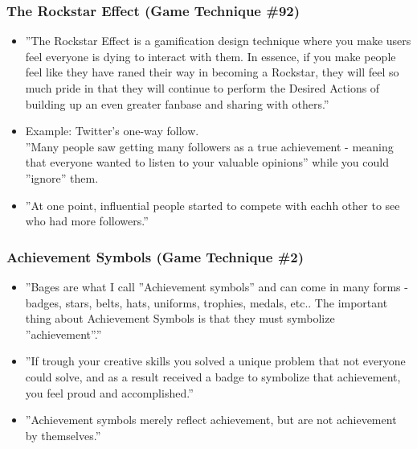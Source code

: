 \subsubsection{The Rockstar Effect (Game Technique \#92)}
\begin{itemize}
    \item ''The Rockstar Effect is a gamification design technique where you make users feel everyone is dying to interact with them. In essence, if you make people feel like they have raned their way in becoming a Rockstar, they will feel so much pride in that they will continue to perform the Desired Actions of building up an even greater fanbase and sharing with others.''
    \item Example: Twitter's one-way follow.\\
    ''Many people saw getting many followers as a true achievement - meaning that everyone wanted to listen to your valuable opinions'' while you could ''ignore'' them.
    \item ''At one point, influential people started to compete with eachh other to see who had more followers.''
\end{itemize}

\subsubsection{Achievement Symbols (Game Technique \#2)}
\begin{itemize}
    \item ''Bages are what I call ''Achievement symbols'' and can come in many forms - badges, stars, belts, hats, uniforms, trophies, medals, etc.. The important thing about Achievement Symbols is that they must symbolize ''achievement''.''
    \item ''If trough your creative skills you solved a unique problem that not everyone could solve, and as a result received a badge to symbolize that achievement, you feel proud and accomplished.''
    \item ''Achievement symbols merely reflect achievement, but are not achievement by themselves.''
\end{itemize}

